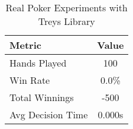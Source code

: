 \begin{table}[h]
\centering
\caption{Real Poker Experiments with Treys Library}
\begin{tabular}{|l|c|}
\hline
Metric & Value \\
\hline
Hands Played & 100 \\
Win Rate & 0.0\% \\
Total Winnings & -500 \\
Avg Decision Time & 0.000s \\
\hline
\end{tabular}
\end{table}
